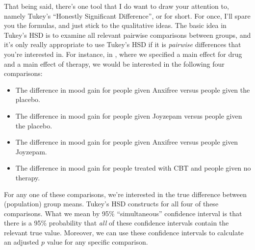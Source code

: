 That being said, there's one tool that I do want to draw your attention to, namely Tukey's ``Honestly Significant Difference'', or  for short. For once, I'll spare you the formulas, and just stick to the qualitative ideas. The basic idea in Tukey's HSD is to examine all relevant pairwise comparisons between groups, and it's only really appropriate to use Tukey's HSD if it is {\it pairwise} differences that you're interested in. For instance, in , where we specified a main effect for drug and a main effect of therapy, we would be interested in the following four comparisons:
\begin{itemize}
\item The difference in mood gain for people given Anxifree versus people given the placebo.
\item The difference in mood gain for people given Joyzepam versus people given the placebo.
\item The difference in mood gain for people given Anxifree versus people given Joyzepam.
\item The difference in mood gain for people treated with CBT and people given no therapy.
\end{itemize}
For any one of these comparisons, we're interested in the true difference between (population) group means. Tukey's HSD constructs  for all four of these comparisons. What we mean by 95\% ``simultaneous'' confidence interval is that there is a 95\% probability that {\it all} of these confidence intervals contain the relevant true value. Moreover, we can use these confidence intervals to calculate an adjusted $p$ value for any specific comparison. 


